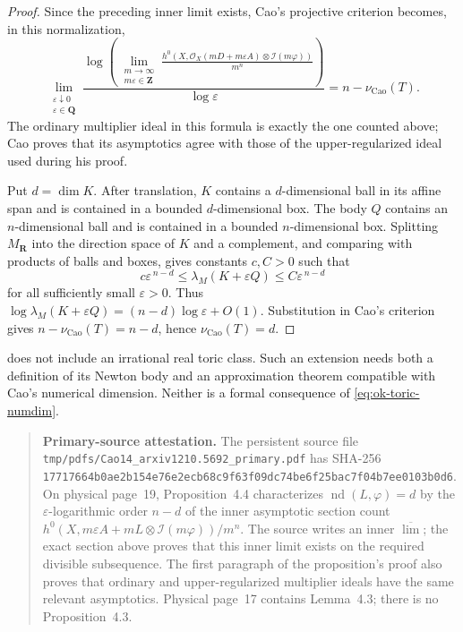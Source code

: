 \begin{proof}
Since the preceding inner limit exists, Cao's projective criterion
\cite[Proposition~4.4]{Cao14} becomes, in this normalization,
\[
 \lim_{\substack{\varepsilon\downarrow0\\
                  \varepsilon\in\mathbf Q}}
 \frac{\log\!\left(
   \displaystyle\lim_{\substack{m\to\infty\\m\varepsilon\in\mathbf Z}}
   \frac{h^0\!\left(X,\mathcal O_X(mD+m\varepsilon A)
                    \otimes\mathcal I(m\varphi)\right)}{m^n}
   \right)}{\log\varepsilon}
 =n-\nu_{\mathrm{Cao}}(T).
\]
The ordinary multiplier ideal in this formula is exactly the one counted
above; Cao proves that its asymptotics agree with those of the
upper-regularized ideal used during his proof.

Put \(d=\dim K\).
After translation, \(K\) contains a \(d\)-dimensional ball in its affine
span and is contained in a bounded \(d\)-dimensional box.  The body \(Q\)
contains an \(n\)-dimensional ball and is contained in a bounded
\(n\)-dimensional box.  Splitting \(M_{\mathbf R}\) into the direction space
of \(K\) and a complement, and comparing with products of balls and boxes,
gives constants \(c,C>0\) such that
\[
 c\varepsilon^{\,n-d}
 \leq\lambda_M(K+\varepsilon Q)
 \leq C\varepsilon^{\,n-d}
\tag{55.52}\label{eq:ok-toric-tube-growth}
\]
for all sufficiently small \(\varepsilon>0\).
Thus
\(\log\lambda_M(K+\varepsilon Q)
 =(n-d)\log\varepsilon+O(1)\).  Substitution in Cao's criterion gives
\(n-\nu_{\mathrm{Cao}}(T)=n-d\), hence
\(\nu_{\mathrm{Cao}}(T)=d\).
\end{proof}

\begin{remark}
\label{rem:ok-toric-scope}
 does not include an irrational real toric
class.
Such an extension needs both a definition of its Newton body and an
approximation theorem compatible with Cao's numerical dimension.
Neither is a formal consequence of \eqref{eq:ok-toric-numdim}.
\end{remark}

\begin{quote}
\textbf{Primary-source attestation.}
The persistent source file
\texttt{tmp/pdfs/Cao14\_arxiv1210.5692\_primary.pdf} has SHA-256
\texttt{17717664b0ae2b154e76e2ecb68c9f63f09dc74be6f25bac7f04b7ee0103b0d6}.
On physical page~19, Proposition~4.4 characterizes
\(\operatorname{nd}(L,\varphi)=d\) by the \(\varepsilon\)-logarithmic order
\(n-d\) of the inner asymptotic section count
\(h^0(X,m\varepsilon A+mL\otimes\mathcal I(m\varphi))/m^n\).
The source writes an inner \(\overline{\lim}\); the exact section above proves
that this inner limit exists on the required divisible subsequence.  The first
paragraph of the proposition's proof also proves that ordinary and
upper-regularized multiplier ideals have the same relevant asymptotics.
Physical page~17 contains Lemma~4.3; there is no Proposition~4.3.
\end{quote}
